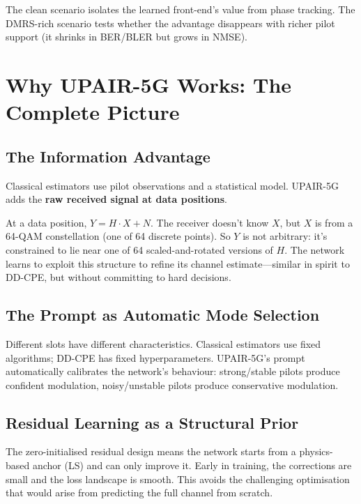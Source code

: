 \documentclass[11pt,a4paper]{article}
\begin{document}
	The clean scenario isolates the learned front-end's value from phase tracking.  The DMRS-rich scenario tests whether the advantage disappears with richer pilot support (it shrinks in BER/BLER but grows in NMSE).
	
	\section{Why UPAIR-5G Works: The Complete Picture}
	
	\subsection{The Information Advantage}
	
	Classical estimators use pilot observations and a statistical model.  UPAIR-5G adds the \textbf{raw received signal at data positions}.
	
	At a data position, $Y = H \cdot X + N$.  The receiver doesn't know $X$, but $X$ is from a 64-QAM constellation (one of 64 discrete points).  So $Y$ is not arbitrary: it's constrained to lie near one of 64 scaled-and-rotated versions of $H$.  The network learns to exploit this structure to refine its channel estimate---similar in spirit to DD-CPE, but without committing to hard decisions.
	
	\subsection{The Prompt as Automatic Mode Selection}
	
	Different slots have different characteristics.  Classical estimators use fixed algorithms; DD-CPE has fixed hyperparameters.  UPAIR-5G's prompt automatically calibrates the network's behaviour: strong/stable pilots produce confident modulation, noisy/unstable pilots produce conservative modulation.
	
	\subsection{Residual Learning as a Structural Prior}
	
	The zero-initialised residual design means the network starts from a physics-based anchor (LS) and can only improve it.  Early in training, the corrections are small and the loss landscape is smooth.  This avoids the challenging optimisation that would arise from predicting the full channel from scratch.
	
\end{document}
